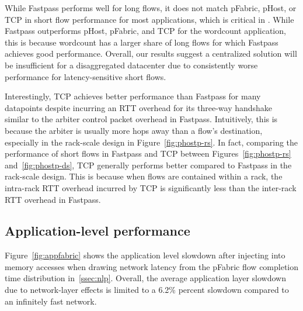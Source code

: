 While Fastpass performs well for long flows, it does not match pFabric, pHost, or TCP in short flow performance for most applications, which is critical in \dis. While Fastpass outperforms pHost, pFabric, and TCP for the wordcount application, this is because wordcount has a larger share of long flows for which Fastpass achieves good performance. Overall, our results suggest a centralized solution will be insufficient for a disaggregated datacenter due to consistently worse performance for latency-sensitive short flows.

Interestingly, TCP achieves better performance than Fastpass for many datapoints despite incurring an RTT overhead for its three-way handshake similar to the arbiter control packet overhead in Fastpass. Intuitively, this is because the arbiter is usually more hops away than a flow's destination, especially in the rack-scale design in Figure~\ref{fig:phostp-rs}. In fact, comparing the performance of short flows in Fastpass and TCP between Figures~\ref{fig:phostp-rs} and~\ref{fig:phostp-ds}, TCP generally performs better compared to Fastpass in the rack-scale design. This is because when flows are contained within a rack, the intra-rack RTT overhead incurred by TCP is significantly less than the inter-rack RTT overhead in Fastpass.


\subsection{Application-level performance}
\label{ssec:alp}
Figure~\ref{fig:appfabric} shows the application level slowdown after injecting into memory accesses when drawing network latency from the pFabric flow completion time distribution in~\ref{ssec:nlp}. Overall, the average application layer slowdown due to network-layer effects is limited to a 6.2\% percent slowdown compared to an infinitely fast network. 


